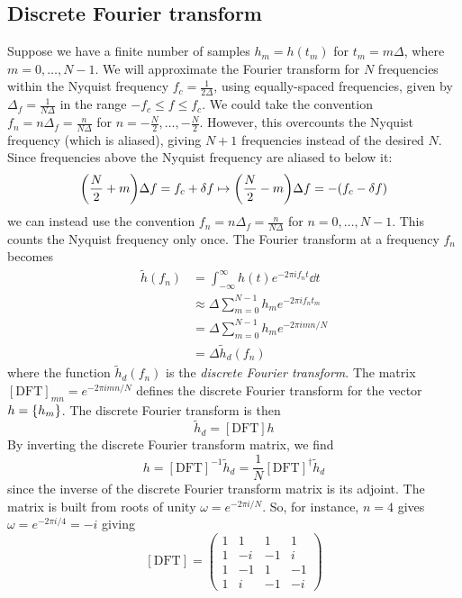 \subsection{Discrete Fourier transform}
Suppose we have a finite number of samples \( h_m = h(t_m) \) for \( t_m = m \Delta \), where \( m = 0,\dots, N-1 \).
We will approximate the Fourier transform for \( N \) frequencies within the Nyquist frequency \( f_c = \frac{1}{2\Delta} \), using equally-spaced frequencies, given by \( \Delta_f = \frac{1}{N\Delta} \) in the range \( -f_c \leq f \leq f_c \).
We could take the convention \( f_n = n \Delta_f = \frac{n}{N\Delta} \) for \( n = -\frac{N}{2}, \dots, -\frac{N}{2} \).
However, this overcounts the Nyquist frequency (which is aliased), giving \( N + 1 \) frequencies instead of the desired \( N \).
Since frequencies above the Nyquist frequency are aliased to below it:
\[
	\qty(\frac{N}{2} + m) \Delta f = f_c + \delta f \mapsto \qty(\frac{N}{2} - m)\Delta f = -(f_c - \delta f)
\]
we can instead use the convention \( f_n = n \Delta_f = \frac{n}{N\Delta} \) for \( n = 0, \dots, N - 1 \).
This counts the Nyquist frequency only once.
The Fourier transform at a frequency \( f_n \) becomes
\begin{align*}
	\widetilde h(f_n) & = \int_{-\infty}^\infty h(t) e^{-2\pi if_n t} \dd{t}    \\
	                  & \approx \Delta \sum_{m=0}^{N-1} h_m e^{-2\pi i f_n t_m} \\
	                  & = \Delta \sum_{m=0}^{N-1} h_m e^{-2\pi i m n / N}       \\
	                  & = \Delta \widetilde h_d(f_n)
\end{align*}
where the function \( \widetilde h_d(f_n) \) is the \textit{discrete Fourier transform}.
The matrix \( [\mathrm{DFT}]_{mn} = e^{-2\pi i m n / N} \) defines the discrete Fourier transform for the vector \( h = \qty{h_m} \).
The discrete Fourier transform is then
\[
	\widetilde h_d = [\mathrm{DFT}] h
\]
By inverting the discrete Fourier transform matrix, we find
\[
	h = [\mathrm{DFT}]^{-1} \widetilde h_d = \frac{1}{N} [\mathrm{DFT}]^\dagger \widetilde h_d
\]
since the inverse of the discrete Fourier transform matrix is its adjoint.
The matrix is built from roots of unity \( \omega = e^{-2\pi i/N} \).
So, for instance, \( n = 4 \) gives \( \omega = e^{-2\pi i/4} = -i \) giving
\[
	[\mathrm{DFT}] = \begin{pmatrix}
		1 & 1  & 1  & 1  \\
		1 & -i & -1 & i  \\
		1 & -1 & 1  & -1 \\
		1 & i  & -1 & -i
	\end{pmatrix}
\]
